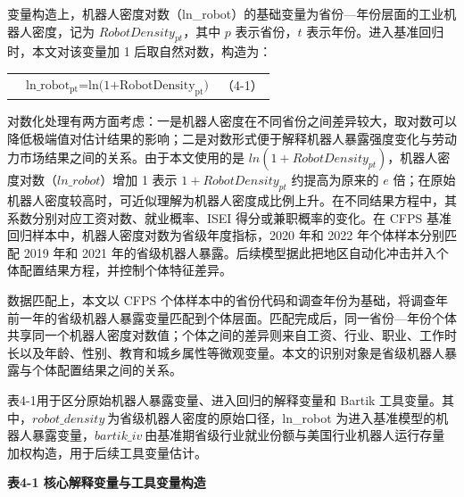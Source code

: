 变量构造上，机器人密度对数（ln\_robot）的基础变量为省份---年份层面的工业机器人密度，记为 \(RobotDensity_{pt}\)，其中 \(p\) 表示省份，\(t\) 表示年份。进入基准回归时，本文对该变量加 1 后取自然对数，构造为：

{\def\LTcaptype{none} %
\begin{longtable}[]{@{}
  >{\centering\arraybackslash}p{}
  >{\centering\arraybackslash}p{}
  >{\raggedright\arraybackslash}p{}@{}}
\toprule\noalign{}
\endhead
\bottomrule\noalign{}
\endlastfoot
& \(\text{ln\_robo}\text{t}_{\text{pt}}\text{=ln(1+RobotDensit}\text{y}_{\text{pt}}\text{)}\) & （4-1） \\
\end{longtable}
}

对数化处理有两方面考虑：一是机器人密度在不同省份之间差异较大，取对数可以降低极端值对估计结果的影响；二是对数形式便于解释机器人暴露强度变化与劳动力市场结果之间的关系。由于本文使用的是 \(ln(1 + RobotDensity_{pt})\)，机器人密度对数（\(ln\_ robot\)）增加 1 表示 \(1 + RobotDensity_{pt}\) 约提高为原来的 \(e\) 倍；在原始机器人密度较高时，可近似理解为机器人密度成比例上升。在不同结果方程中，其系数分别对应工资对数、就业概率、ISEI 得分或兼职概率的变化。在 CFPS 基准回归样本中，机器人密度对数为省级年度指标，2020 年和 2022 年个体样本分别匹配 2019 年和 2021 年的省级机器人暴露。后续模型据此把地区自动化冲击并入个体配置结果方程，并控制个体特征差异。

数据匹配上，本文以 CFPS 个体样本中的省份代码和调查年份为基础，将调查年前一年的省级机器人暴露变量匹配到个体层面。匹配完成后，同一省份---年份个体共享同一个机器人密度对数值；个体之间的差异则来自工资、行业、职业、工作时长以及年龄、性别、教育和城乡属性等微观变量。本文的识别对象是省级机器人暴露与个体配置结果之间的关系。

表4-1用于区分原始机器人暴露变量、进入回归的解释变量和 Bartik 工具变量。其中，\(robot\_ density\ \)为省级机器人密度的原始口径，ln\_robot 为进入基准模型的机器人暴露变量，\(bartik\_ iv\ \)由基准期省级行业就业份额与美国行业机器人运行存量加权构造，用于后续工具变量估计。

\textbf{表4-1 核心解释变量与工具变量构造}

